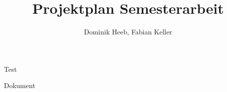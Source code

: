\documentclass[10pt,a4paper]{article}
\author{Dominik Heeb, Fabian Keller}
\title{Projektplan Semesterarbeit}
\begin{document}
\begin{titlepage}
	Test
\end{titlepage}


	Dokument
\end{document}

